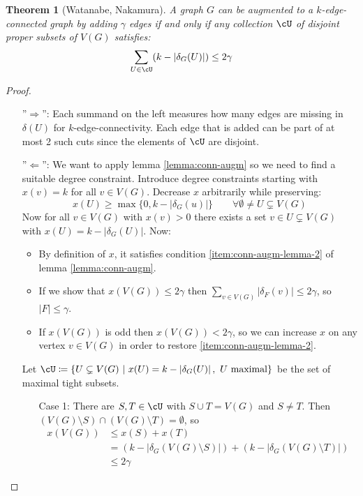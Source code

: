 \documentclass[11pt, a4paper]{article}
\newcommand{\abs}[1]{\left\lvert#1\right\rvert}
\newcommand{\set}[1]{\{#1\}}
\newtheorem{theorem}{Theorem}[section]
\theoremstyle{remark}
\theoremstyle{definition}
\begin{document}
\begin{theorem}[Watanabe, Nakamura]
	A graph $G$ can be augmented to a $k$-edge-connected graph by adding $\gamma$
	edges if and only if any collection $\cU$ of disjoint proper subsets of
	$V(G)$ satisfies:
	\[\sum_{U\in\cU}(k-\abs{\delta_G(U)})\leq 2\gamma\]
\end{theorem}
\begin{proof}\
	\begin{enumerate}
		\item[''$\Rightarrow$'':]
		Each summand on the left measures how many edges are missing in
		$\delta(U)$ for $k$-edge-connectivity. Each edge that is added can
		be part of at most 2 such cuts since the elements of $\cU$ are disjoint.

		\item[''$\Leftarrow$'':]
		We want to apply lemma \ref{lemma:conn-augm} so we need to find a
		suitable degree constraint. Introduce degree constraints starting with
		$x(v)=k$ for all $v\in V(G)$. Decrease $x$ arbitrarily while preserving:
		\[x(U)\geq\max\set{0, k-\abs{\delta_G(u)}}\qquad
			\forall \emptyset\neq U\subsetneq V(G)\]
		Now for all $v\in V(G)$ with $x(v)>0$ there exists a set $v\in
			U\subsetneq V(G)$ with $x(U)=k-\abs{\delta_G(U)}$. Now:
		\begin{itemize}
			\item
			By definition of $x$, it satisfies condition \ref{item:conn-augm-lemma-2}
			of lemma \ref{lemma:conn-augm}.

			\item
			If we show that $x(V(G))\leq 2\gamma$ then $\sum_{v\in V(G)}
				\abs{\delta_F(v)}\leq2\gamma$, so $\abs{F}\leq\gamma$.

			\item
			If $x(V(G))$ is odd then $x(V(G))<2\gamma$, so we can increase
			$x$ on any vertex $v\in V(G)$ in order to restore
			\ref{item:conn-augm-lemma-2}.
		\end{itemize}
		Let $\cU\coloneqq\set{U\subsetneq V(G)\ |\ x(U)=k-\abs{\delta_G(U)},
				\ U\text{ maximal}}$ be the set of maximal tight subsets.
		\begin{enumerate}
			\item[Case 1:] There are $S,T\in\cU$ with $S\cup T=V(G)$ and $S\neq T$.
			Then $(V(G)\setminus S)\cap (V(G)\setminus T)=\emptyset$, so
			\begin{align*}
				x(V(G)) & \leq x(S)+x(T)                       \\
				        & =(k-\abs{\delta_G(V(G)\setminus S)})
				+(k-\abs{\delta_G(V(G)\setminus T)})           \\
				        & \leq 2\gamma
			\end{align*}


\end{enumerate}
\end{enumerate}
\end{proof}
\end{document}
